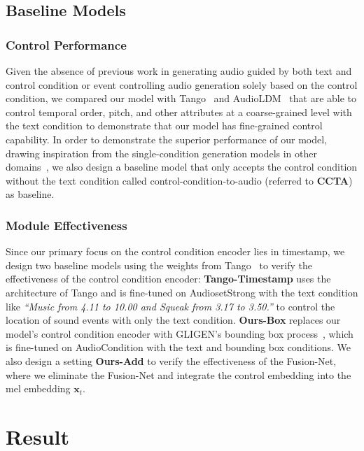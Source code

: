 \documentclass[letterpaper]{article} %
\begin{document}
\subsection{Baseline Models}

\subsubsection{Control Performance} Given the absence of previous work in generating audio guided by both text and control condition or event controlling audio generation solely based on the control condition, we compared our model with Tango~\cite{ghosal2023tango} and AudioLDM~\cite{liu2023audioldm} that are able to control temporal order, pitch, and other attributes at a coarse-grained level with the text condition to demonstrate that our model has fine-grained control capability. In order to demonstrate the superior performance of our model, drawing inspiration from the single-condition generation models in other domains~\cite{jahn2021highresolutioncs,li2023blip2,radford2020gpt3}, we also design a baseline model that only accepts the control condition without the text condition called control-condition-to-audio (referred to \textbf{CCTA}) as baseline.

\subsubsection{Module Effectiveness} Since our primary focus on the control condition encoder lies in timestamp, we design two baseline models using the weights from Tango~\cite{ghosal2023tango} to verify the effectiveness of the control condition encoder: \textbf{Tango-Timestamp} uses the architecture of Tango and is fine-tuned on AudiosetStrong with the text condition like \textit{``Music from 4.11 to 10.00 and Squeak from 3.17 to 3.50.''} to control the location of sound events with only the text condition. \textbf{Ours-Box} replaces our model's control condition encoder with GLIGEN's bounding box process~\cite{li2023gligen}, which is fine-tuned on AudioCondition with the text and bounding box conditions. We also design a setting \textbf{Ours-Add} to verify the effectiveness of the Fusion-Net, where we eliminate the Fusion-Net and integrate the control embedding into the mel embedding $\mathbf{x}_{t}$.

\section{Result}
\end{document}
